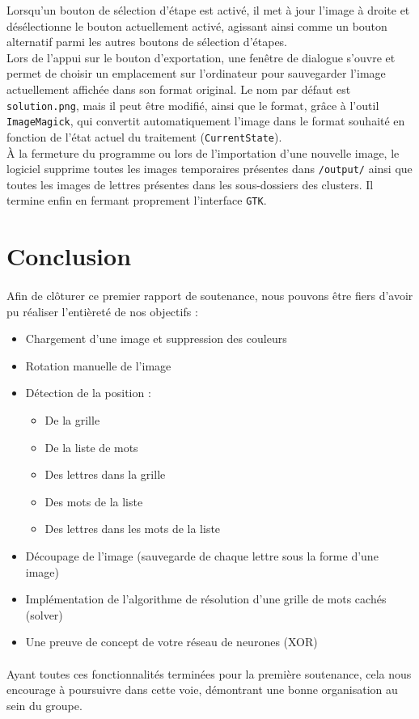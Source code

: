 \documentclass{article}
\begin{document}
Lorsqu'un bouton de sélection d'étape est activé, il met à jour l'image à droite et désélectionne le bouton actuellement activé, agissant ainsi comme un bouton alternatif parmi les autres boutons de sélection d'étapes.\\

Lors de l'appui sur le bouton d'exportation, une fenêtre de dialogue s'ouvre et permet de choisir un emplacement sur l'ordinateur pour sauvegarder l'image actuellement affichée dans son format original. Le nom par défaut est \texttt{solution.png}, mais il peut être modifié, ainsi que le format, grâce à l'outil \texttt{ImageMagick}, qui convertit automatiquement l'image dans le format souhaité en fonction de l'état actuel du traitement (\texttt{CurrentState}).\\

À la fermeture du programme ou lors de l'importation d'une nouvelle image, le logiciel supprime toutes les images temporaires présentes dans \texttt{/output/} ainsi que toutes les images de lettres présentes dans les sous-dossiers des clusters. Il termine enfin en fermant proprement l'interface \texttt{GTK}.\\
\newpage
\section{Conclusion}
\paragraph{}
Afin de cl\^oturer ce premier rapport de soutenance, nous pouvons \^etre fiers d'avoir pu r\'ealiser l'enti\`eret\'e de nos objectifs :
\begin{itemize}
    \item Chargement d'une image et suppression des couleurs 
    \item Rotation manuelle de l'image 
    \item D\'etection de la position : 
    \begin{itemize}
        \item De la grille
        \item De la liste de mots
        \item Des lettres dans la grille
        \item Des mots de la liste
        \item Des lettres dans les mots de la liste
    \end{itemize}
    \item D\'ecoupage de l'image (sauvegarde de chaque lettre sous la forme d'une image)
    \item Impl\'ementation de l'algorithme de r\'esolution d'une grille de mots cach\'es (solver)
    \item Une preuve de concept de votre r\'eseau de neurones (XOR)
\end{itemize}
\paragraph{}
Ayant toutes ces fonctionnalit\'es termin\'ees pour la premi\`ere soutenance, cela nous encourage \`a poursuivre dans cette voie, d\'emontrant une bonne organisation au sein du groupe.
\end{document}
